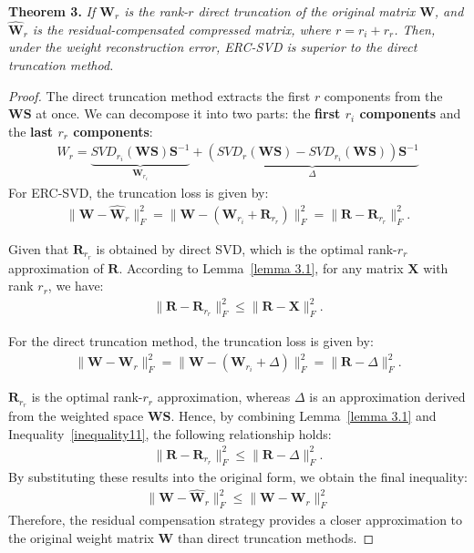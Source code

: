 \textbf{Theorem 3.} \textit{If $\boldsymbol{W}_r$ is the rank-$r$ direct truncation of the original matrix $\boldsymbol{W}$, and $\hat{\boldsymbol{W}}_r$ is the residual-compensated compressed matrix, where $r=r_i + r_r$. Then, under the weight reconstruction error, ERC-SVD is superior to the direct truncation method.}
\begin{proof}
The direct truncation method extracts the first $r$ components from the $\boldsymbol{WS}$ at once. We can decompose it into two parts: the \textbf{first $r_i$ components} and the \textbf{last $r_r$ components}:
\begin{align}
   W_r = \underbrace{SVD_{r_i}(\boldsymbol{WS})\boldsymbol{S}^{-1}}_{\boldsymbol{W}_{r_i}} + \underbrace{(SVD_{r}(\boldsymbol{WS}) - SVD_{r_i}(\boldsymbol{WS}))\boldsymbol{S}^{-1}}_{\Delta}
\end{align}
For ERC-SVD, the truncation loss is given by:
\begin{gather}
   \big\|\boldsymbol{W}-\hat{\boldsymbol{W}}_r\big\|_F^2 = \big\|\boldsymbol{W}-(\boldsymbol{W}_{r_i}+\boldsymbol{R}_{r_r})\big\|_F^2 = \big\|\boldsymbol{R} - \boldsymbol{R}_{r_r}\big\|_F^2.
\end{gather}

Given that $\boldsymbol{R}_{r_r}$ is obtained by direct SVD, which is the optimal rank-$r_r$ approximation of $\boldsymbol{R}$. According to Lemma~\ref{lemma 3.1}, for any matrix $\boldsymbol{X}$ with rank $r_r$, we have:
\begin{align}
    \big\|\boldsymbol{R}-\boldsymbol{R}_{r_r}\big\|_F^2 \le \big\|\boldsymbol{R}-\boldsymbol{X}\big\|_F^2. \label{inequality11}
\end{align}

For the direct truncation method, the truncation loss is given by:
\begin{gather}
   \big\|\boldsymbol{W}-\boldsymbol{W}_r\big\|_F^2 = \big\|\boldsymbol{W}-(\boldsymbol{W}_{r_i}+\Delta)\big\|_F^2 = \big\|\boldsymbol{R} - \Delta\big\|_F^2.
\end{gather}

$\boldsymbol{R}_{r_r}$ is the optimal rank-$r_r$ approximation, whereas $\Delta$ is an approximation derived from the weighted space $\boldsymbol{WS}$. Hence, by combining Lemma~\ref{lemma 3.1} and Inequality~\ref{inequality11}, the following relationship holds:
\begin{align}
   \big\|\boldsymbol{R}-\boldsymbol{R}_{r_r}\big\|_F^2 \le \big\|\boldsymbol{R}-\Delta\big\|_F^2.
\end{align} 
By substituting these results into the original form, we obtain the final inequality:
\begin{align}
    \boxed{\big\|\boldsymbol{W}-\hat{\boldsymbol{W}}_r\big\|_F^2 \le \big\|\boldsymbol{W}-\boldsymbol{W}_r\big\|_F^2}
\end{align}
Therefore, the residual compensation strategy provides a closer approximation to the original weight matrix $\boldsymbol{W}$ than direct truncation methods.
\end{proof}

